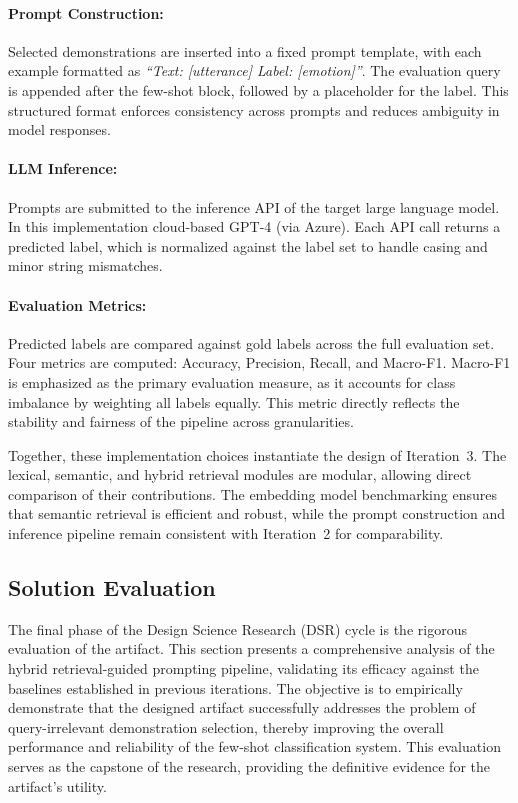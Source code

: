 \paragraph{Prompt Construction:}  
Selected demonstrations are inserted into a fixed prompt template, with each example formatted as \emph{``Text: [utterance] \newline Label: [emotion]''}. 
The evaluation query is appended after the few-shot block, followed by a placeholder for the label. 
This structured format enforces consistency across prompts and reduces ambiguity in model responses.  

\paragraph{LLM Inference:}  
Prompts are submitted to the inference API of the target large language model. 
In this implementation cloud-based GPT-4 (via Azure). 
Each API call returns a predicted label, which is normalized against the label set to handle casing and minor string mismatches.  

\paragraph{Evaluation Metrics:}  
Predicted labels are compared against gold labels across the full evaluation set. 
Four metrics are computed: Accuracy, Precision, Recall, and Macro-F1. 
Macro-F1 is emphasized as the primary evaluation measure, as it accounts for class imbalance by weighting all labels equally. 
This metric directly reflects the stability and fairness of the pipeline across granularities.  

\medskip
Together, these implementation choices instantiate the design of Iteration~3. 
The lexical, semantic, and hybrid retrieval modules are modular, allowing direct comparison of their contributions. 
The embedding model benchmarking ensures that semantic retrieval is efficient and robust, while the prompt construction and inference pipeline remain consistent with Iteration~2 for comparability.
\subsection{Solution Evaluation}

The final phase of the Design Science Research (DSR) cycle is the rigorous evaluation of the artifact. This section presents a comprehensive analysis of the hybrid retrieval-guided prompting pipeline, validating its efficacy against the baselines established in previous iterations. The objective is to empirically demonstrate that the designed artifact successfully addresses the problem of query-irrelevant demonstration selection, thereby improving the overall performance and reliability of the few-shot classification system. This evaluation serves as the capstone of the research, providing the definitive evidence for the artifact's utility.

